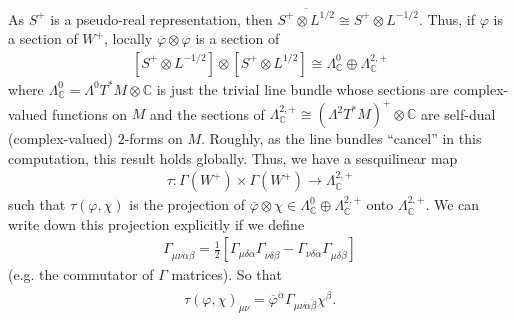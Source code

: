 \documentclass[12pt, onecolumn]{article}
\newenvironment{remark}[1][Remark]{\begin{trivlist}
\item[\hskip \labelsep {\bfseries #1}]}{\end{trivlist}}
\begin{document}
\begin{remark}
As $S^{+}$ is a pseudo-real representation, then $\overline{S^{+} \otimes L^{1/2}} \cong S^{+} \otimes L^{-1/2}$.  Thus, if $\varphi$ is a section of $W^{+}$, locally $\overline{\varphi} \otimes \varphi$ is a section of
\begin{align*}
\left[S^{+} \otimes L^{-1/2}\right] \otimes \left[S^{+} \otimes L^{1/2}\right] \cong \Lambda^{0}_{\mathbb{C}} \oplus \Lambda^{2,+}_{\mathbb{C}}
\end{align*}
where $\Lambda^{0}_{\mathbb{C}}=\Lambda^{0}T^*M\otimes \mathbb{C}$ is just the trivial line bundle whose sections are complex-valued functions on $M$ and the sections of $\Lambda^{2,+}_{\mathbb{C}} \cong \left(\Lambda^{2}T^*M\right)^{+} \otimes \mathbb{C}$ are self-dual (complex-valued) $2$-forms on $M$.  Roughly, as the line bundles ``cancel'' in this computation, this result holds globally.  Thus, we have a sesquilinear map
\begin{align*}
\tau: \Gamma(W^{+}) \times \Gamma(W^{+}) \rightarrow \Lambda^{2,+}_{\mathbb{C}}
\end{align*}
such that $\tau(\varphi,\chi)$ is the projection of $\overline{\varphi} \otimes \chi \in \Lambda^{0}_{\mathbb{C}} \oplus \Lambda^{2,+}_{\mathbb{C}}$ onto $\Lambda^{2,+}_{\mathbb{C}}$.  We can write down this projection explicitly if we define
\begin{align*}
\Gamma_{\mu \nu \dot{\alpha} \dot{\beta}}=\frac{1}{2}\left[\Gamma_{\mu \delta \dot{\alpha}}\Gamma_{\nu \delta \dot{\beta}}-\Gamma_{\nu \delta \dot{\alpha}}\Gamma_{\mu \delta \dot{\beta}}\right]
\end{align*}
(e.g. the commutator of $\Gamma$ matrices).  So that
\begin{align*}
\tau(\varphi,\chi)_{\mu \nu}=\overline{\varphi}^{\dot{\alpha}}\Gamma_{\mu \nu \dot{\alpha} \dot{\beta}}\chi^{\dot{\beta}}.
\end{align*}
\end{remark}
\end{document}
